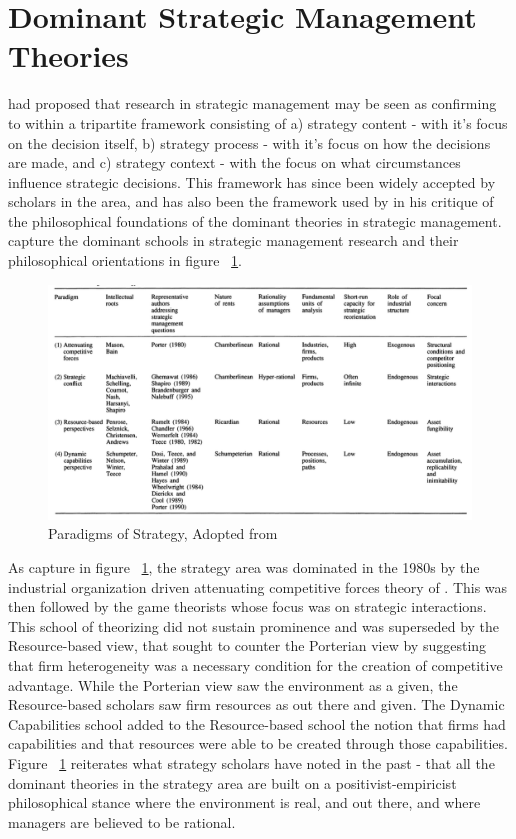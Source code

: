 \documentclass[12pt]{article}
\begin{document}
\section{Dominant Strategic Management Theories}\label{S:DominantTheories}
\cite{Pettigrew1988} had proposed that research in strategic management may be seen as confirming to within a tripartite framework consisting of a) strategy content - with it's focus on the decision itself, b) strategy process - with it's focus on how the decisions are made, and c) strategy context - with the focus on what circumstances influence strategic decisions. This framework has since been widely accepted by scholars in the area, and has also been the framework used by \cite{Rasche2008} in his critique of the philosophical foundations of the dominant theories in strategic management. \cite{Teece1997b} capture the dominant schools in strategic management research and their philosophical orientations in figure ~\ref{fig:paradigms}. 
\begin{figure}[h]
\centering
\includegraphics[width=16cm]{ParadigmsofStrategyTeece1997b}
\caption{Paradigms of Strategy, Adopted from \cite{Teece1997b}}
\label{fig:paradigms}
\end{figure}

As \cite{Teece1997b} capture in figure ~\ref{fig:paradigms}, the strategy area was dominated in the 1980s by the industrial organization driven attenuating competitive forces theory of \cite{Porter1980}. This was then followed by the game theorists whose focus was on strategic interactions. This school of theorizing did not sustain prominence and was superseded by the Resource-based view, that sought to counter the Porterian view by suggesting that firm heterogeneity was a necessary condition for the creation of competitive advantage. While the Porterian view saw the environment as a given, the Resource-based scholars saw firm resources as out there and given. The Dynamic Capabilities school added to the Resource-based school the notion that firms had capabilities and that resources were able to be created through those capabilities. Figure ~\ref{fig:paradigms} reiterates what strategy scholars have noted in the past - that all the dominant theories in the strategy area are built on a positivist-empiricist philosophical stance where the environment is real, and out there, and where managers are believed to be rational.
\end{document}
